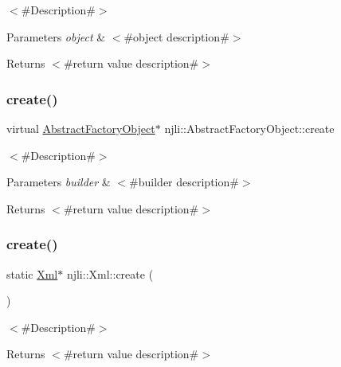 $<$\#\+Description\#$>$


\begin{DoxyParams}{Parameters}
{\em object} & $<$\#object description\#$>$\\
\hline
\end{DoxyParams}
\begin{DoxyReturn}{Returns}
$<$\#return value description\#$>$ 
\end{DoxyReturn}
\mbox{\label{classnjli_1_1_xml_a83a8876ae63b92804004cf3febe76573}} 
\subsubsection{\texorpdfstring{create()}{create()}\hspace{0.1cm}{\footnotesize\ttfamily [1/3]}}
{\footnotesize\ttfamily virtual \mbox{\hyperlink{classnjli_1_1_abstract_factory_object}{Abstract\+Factory\+Object}}$\ast$ njli\+::\+Abstract\+Factory\+Object\+::create}

$<$\#\+Description\#$>$


\begin{DoxyParams}{Parameters}
{\em builder} & $<$\#builder description\#$>$\\
\hline
\end{DoxyParams}
\begin{DoxyReturn}{Returns}
$<$\#return value description\#$>$ 
\end{DoxyReturn}
\mbox{\label{classnjli_1_1_xml_a63ccb1a4b1a10e343a5a32786ff57fee}} 
\subsubsection{\texorpdfstring{create()}{create()}\hspace{0.1cm}{\footnotesize\ttfamily [2/3]}}
{\footnotesize\ttfamily static \mbox{\hyperlink{classnjli_1_1_xml}{Xml}}$\ast$ njli\+::\+Xml\+::create (\begin{DoxyParamCaption}{ }\end{DoxyParamCaption})\hspace{0.3cm}{\ttfamily [static]}}

$<$\#\+Description\#$>$

\begin{DoxyReturn}{Returns}
$<$\#return value description\#$>$ 
\end{DoxyReturn}
\mbox{\label{classnjli_1_1_xml_a6c1601d45fcec911477a41f2288d3729}} 
